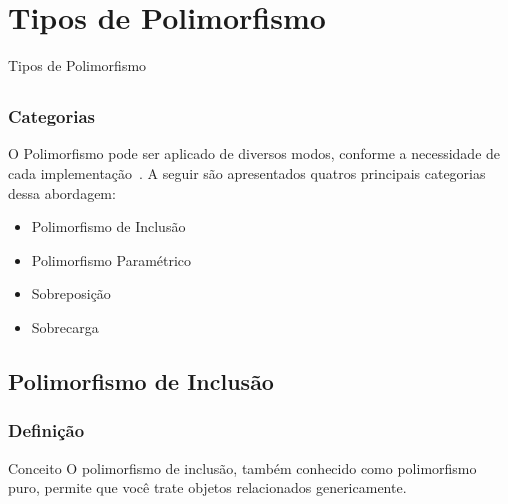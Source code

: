 \section{Tipos de Polimorfismo}

\begin{frame}
\centering
\Huge Tipos de Polimorfismo
\end{frame}

\subsection*{}

\begin{frame}
\frametitle{Categorias}
\justifying
\quad O Polimorfismo pode ser aplicado de diversos modos, conforme a necessidade de cada implementação~\cite{sintes2002aprenda}. 
A seguir são apresentados quatros principais categorias dessa abordagem:

\begin{itemize}
	\item Polimorfismo de Inclusão
	\item Polimorfismo Paramétrico
	\item Sobreposição
	\item Sobrecarga
\end{itemize}
\end{frame}

\subsection{Polimorfismo de Inclusão}

\begin{frame}
\frametitle{Definição}
\justifying
\begin{block}{Conceito}
\qquad O polimorfismo de inclusão, também conhecido como polimorfismo puro, permite que você trate objetos relacionados genericamente.
\end{block}
\end{frame}


